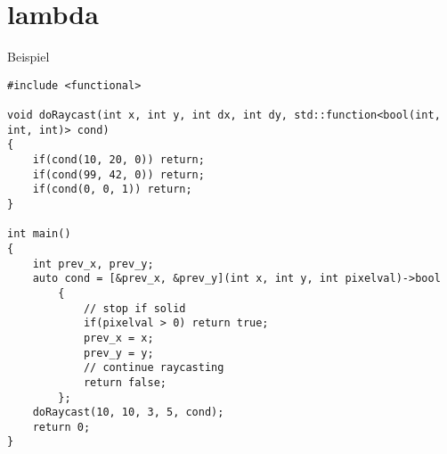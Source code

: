 \section{lambda}

\begin{frame}[fragile]{Beispiel}
	\begin{lstlisting}[basicstyle=\tiny]
#include <functional>

void doRaycast(int x, int y, int dx, int dy, std::function<bool(int, int, int)> cond)
{
    if(cond(10, 20, 0)) return;
    if(cond(99, 42, 0)) return;
    if(cond(0, 0, 1)) return;
}

int main()
{
    int prev_x, prev_y;
    auto cond = [&prev_x, &prev_y](int x, int y, int pixelval)->bool
        {
            // stop if solid
            if(pixelval > 0) return true;
            prev_x = x;
            prev_y = y;
            // continue raycasting
            return false;
        };
    doRaycast(10, 10, 3, 5, cond);
	return 0;
}
	\end{lstlisting}
\end{frame}

